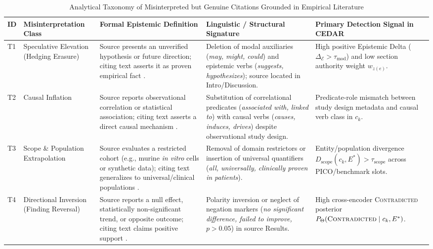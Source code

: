 \documentclass[sigconf]{acmart}
\begin{document}
\begin{table}[t]
\centering
\footnotesize
\caption{Analytical Taxonomy of Misinterpreted but Genuine Citations Grounded in Empirical Literature}
\label{tab:misinterpretation_taxonomy}
\renewcommand{\arraystretch}{1.14}
\begin{tabularx}{\textwidth}{L{0.5cm} L{3.0cm} L{4.2cm} L{4.2cm} Y}
\toprule
\textbf{ID} & \textbf{Misinterpretation Class} & \textbf{Formal Epistemic Definition} & \textbf{Linguistic / Structural Signature} & \textbf{Primary Detection Signal in CEDAR} \\
\midrule
T1 & Speculative Elevation (Hedging Erasure) & Source presents an unverified hypothesis or future direction; citing text asserts it as proven empirical fact \cite{greenberg2009citation,hyland1998hedging}. & Deletion of modal auxiliaries (\emph{may, might, could}) and epistemic verbs (\emph{suggests, hypothesizes}); source located in Intro/Discussion. & High positive Epistemic Delta ($\Delta_{\mathcal{E}} > \tau_{\text{mod}}$) and low section authority weight $w_{z(e)}$. \\
T2 & Causal Inflation & Source reports observational correlation or statistical association; citing text asserts a direct causal mechanism \cite{jergas2015quotation,mogull2017accuracy}. & Substitution of correlational predicates (\emph{associated with, linked to}) with causal verbs (\emph{causes, induces, drives}) despite observational study design. & Predicate-role mismatch between study design metadata and causal verb class in $c_k$. \\
T3 & Scope \& Population Extrapolation & Source evaluates a restricted cohort (e.g., murine \emph{in vitro} cells or synthetic data); citing text generalizes to universal/clinical populations \cite{begley2012raise,pavlovic2021accurate}. & Removal of domain restrictors or insertion of universal quantifiers (\emph{all, universally, clinically proven in patients}). & Entity/population divergence $D_{\text{scope}}(c_k, E^*) > \tau_{\text{scope}}$ across PICO/benchmark slots. \\
T4 & Directional Inversion (Finding Reversal) & Source reports a null effect, statistically non-significant trend, or opposite outcome; citing text claims positive support \cite{delacey1985accurate,todd2010marine}. & Polarity inversion or neglect of negation markers (\emph{no significant difference, failed to improve, $p > 0.05$}) in source Results. & High cross-encoder \textsc{Contradicted} posterior $P_{\Theta}(\textsc{Contradicted} \mid c_k, E^*)$. \\

\end{tabularx}
\end{table}
\end{document}
